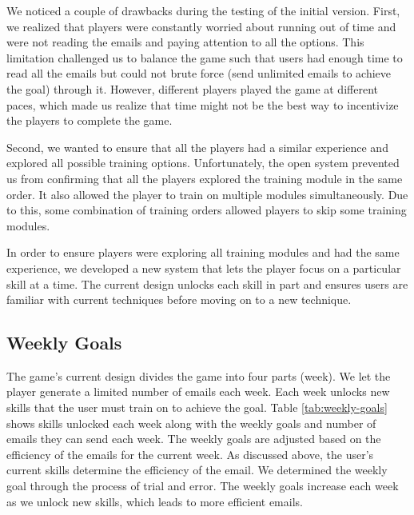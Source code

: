 We noticed a couple of drawbacks during the testing of the initial version. First, we realized that players were constantly worried about running out of time and were not reading the emails and paying attention to all the options. This limitation challenged us to balance the game such that users had enough time to read all the emails but could not brute force (send unlimited emails to achieve the goal) through it. However, different players played the game at different paces, which made us realize that time might not be the best way to incentivize the players to complete the game.

Second, we wanted to ensure that all the players had a similar experience and explored all possible training options. Unfortunately, the open system prevented us from confirming that all the players explored the training module in the same order. It also allowed the player to train on multiple modules simultaneously. Due to this, some combination of training orders allowed players to skip some training modules.

In order to ensure players were exploring all training modules and had the same experience, we developed a new system that lets the player focus on a particular skill at a time. The current design unlocks each skill in part and ensures users are familiar with current techniques before moving on to a new technique.

\subsection{Weekly Goals}
The game's current design divides the game into four parts (week). We let the player generate a limited number of emails each week. Each week unlocks new skills that the user must train on to achieve the goal. Table \ref{tab:weekly-goals} shows skills unlocked each week along with the weekly goals and number of emails they can send each week. The weekly goals are adjusted based on the efficiency of the emails for the current week. As discussed above, the user's current skills determine the efficiency of the email. We determined the weekly goal through the process of trial and error. The weekly goals increase each week as we unlock new skills, which leads to more efficient emails.

